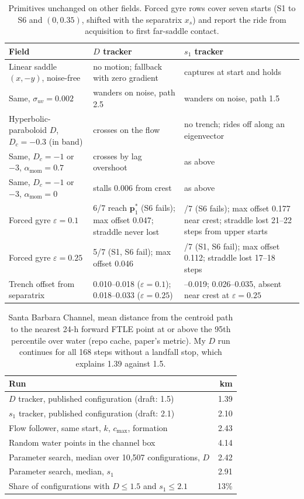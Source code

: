 \documentclass[10.5pt]{article}
\begin{document}
\begin{table}[h]
\centering\small
\caption{Primitives unchanged on other fields. Forced gyre rows cover seven starts (S1 to S6 and $(0,0.35)$, shifted with the separatrix $x_s$) and report the ride from acquisition to first far-saddle contact.}
\label{tab:generic}
\begin{tabularx}{\linewidth}{@{}>{\raggedright}p{4.2cm}>{\raggedright}X>{\raggedright\arraybackslash}X@{}}
\toprule
Field & $D$ tracker & $s_1$ tracker\\
\midrule
Linear saddle $(x,-y)$, noise-free & no motion; fallback with zero gradient & captures at start and holds\\
Same, $\sigma_{uv}=0.002$ & wanders on noise, path 2.5 & wanders on noise, path 1.5\\
Hyperbolic-paraboloid $D$, $D_c=-0.3$ (in band) & crosses on the flow & no trench; rides off along an eigenvector\\
Same, $D_c=-1$ or $-3$, $\alpha_{\mathrm{mom}}=0.7$ & crosses by lag overshoot & as above\\
Same, $D_c=-1$ or $-3$, $\alpha_{\mathrm{mom}}=0$ & stalls 0.006 from crest & as above\\
Forced gyre $\varepsilon=0.1$ & 6/7 reach $\mathbf p_1^*$ (S6 fails); max offset 0.047; straddle never lost & 6/7 (S6 fails); max offset 0.177 near crest; straddle lost 21--22 steps from upper starts\\
Forced gyre $\varepsilon=0.25$ & 5/7 (S1, S6 fail); max offset 0.046 & 5/7 (S1, S6 fail); max offset 0.112; straddle lost 17--18 steps\\
Trench offset from separatrix & 0.010--0.018 ($\varepsilon=0.1$); 0.018--0.033 ($\varepsilon=0.25$) & 0.010--0.019; 0.026--0.035, absent near crest at $\varepsilon=0.25$\\
\bottomrule
\end{tabularx}
\end{table}

\begin{table}[h]
\centering\small
\caption{Santa Barbara Channel, mean distance from the centroid path to the nearest 24-h forward FTLE point at or above the 95th percentile over water (repo cache, paper's metric). My $D$ run continues for all 168 steps without a landfall stop, which explains 1.39 against 1.5.}
\label{tab:ocean}
\begin{tabular}{@{}lr@{}}
\toprule
Run & km\\
\midrule
$D$ tracker, published configuration (draft: 1.5) & 1.39\\
$s_1$ tracker, published configuration (draft: 2.1) & 2.10\\
Flow follower, same start, $k$, $c_{\max}$, formation & 2.43\\
Random water points in the channel box & 4.14\\
Parameter search, median over 10{,}507 configurations, $D$ & 2.42\\
Parameter search, median, $s_1$ & 2.91\\
Share of configurations with $D\le1.5$ and $s_1\le2.1$ & 13\%\\
\bottomrule
\end{tabular}
\end{table}
\end{document}
